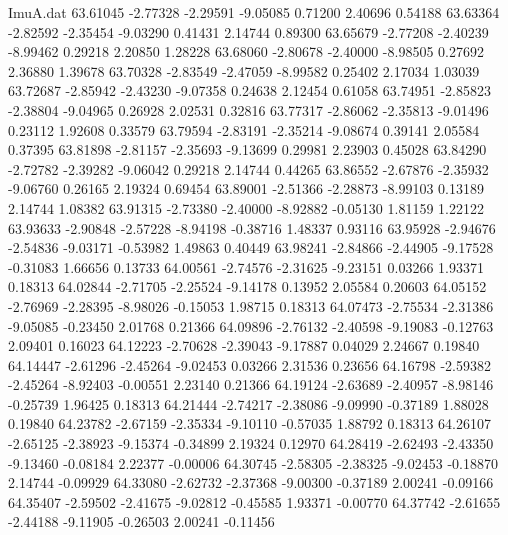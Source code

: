 \begin{filecontents}{ImuA.dat}
  63.61045   -2.77328   -2.29591   -9.05085    0.71200    2.40696    0.54188
  63.63364   -2.82592   -2.35454   -9.03290    0.41431    2.14744    0.89300
  63.65679   -2.77208   -2.40239   -8.99462    0.29218    2.20850    1.28228
  63.68060   -2.80678   -2.40000   -8.98505    0.27692    2.36880    1.39678
  63.70328   -2.83549   -2.47059   -8.99582    0.25402    2.17034    1.03039
  63.72687   -2.85942   -2.43230   -9.07358    0.24638    2.12454    0.61058
  63.74951   -2.85823   -2.38804   -9.04965    0.26928    2.02531    0.32816
  63.77317   -2.86062   -2.35813   -9.01496    0.23112    1.92608    0.33579
  63.79594   -2.83191   -2.35214   -9.08674    0.39141    2.05584    0.37395
  63.81898   -2.81157   -2.35693   -9.13699    0.29981    2.23903    0.45028
  63.84290   -2.72782   -2.39282   -9.06042    0.29218    2.14744    0.44265
  63.86552   -2.67876   -2.35932   -9.06760    0.26165    2.19324    0.69454
  63.89001   -2.51366   -2.28873   -8.99103    0.13189    2.14744    1.08382
  63.91315   -2.73380   -2.40000   -8.92882   -0.05130    1.81159    1.22122
  63.93633   -2.90848   -2.57228   -8.94198   -0.38716    1.48337    0.93116
  63.95928   -2.94676   -2.54836   -9.03171   -0.53982    1.49863    0.40449
  63.98241   -2.84866   -2.44905   -9.17528   -0.31083    1.66656    0.13733
  64.00561   -2.74576   -2.31625   -9.23151    0.03266    1.93371    0.18313
  64.02844   -2.71705   -2.25524   -9.14178    0.13952    2.05584    0.20603
  64.05152   -2.76969   -2.28395   -8.98026   -0.15053    1.98715    0.18313
  64.07473   -2.75534   -2.31386   -9.05085   -0.23450    2.01768    0.21366
  64.09896   -2.76132   -2.40598   -9.19083   -0.12763    2.09401    0.16023
  64.12223   -2.70628   -2.39043   -9.17887    0.04029    2.24667    0.19840
  64.14447   -2.61296   -2.45264   -9.02453    0.03266    2.31536    0.23656
  64.16798   -2.59382   -2.45264   -8.92403   -0.00551    2.23140    0.21366
  64.19124   -2.63689   -2.40957   -8.98146   -0.25739    1.96425    0.18313
  64.21444   -2.74217   -2.38086   -9.09990   -0.37189    1.88028    0.19840
  64.23782   -2.67159   -2.35334   -9.10110   -0.57035    1.88792    0.18313
  64.26107   -2.65125   -2.38923   -9.15374   -0.34899    2.19324    0.12970
  64.28419   -2.62493   -2.43350   -9.13460   -0.08184    2.22377   -0.00006
  64.30745   -2.58305   -2.38325   -9.02453   -0.18870    2.14744   -0.09929
  64.33080   -2.62732   -2.37368   -9.00300   -0.37189    2.00241   -0.09166
  64.35407   -2.59502   -2.41675   -9.02812   -0.45585    1.93371   -0.00770
  64.37742   -2.61655   -2.44188   -9.11905   -0.26503    2.00241   -0.11456

\end{filecontents}
